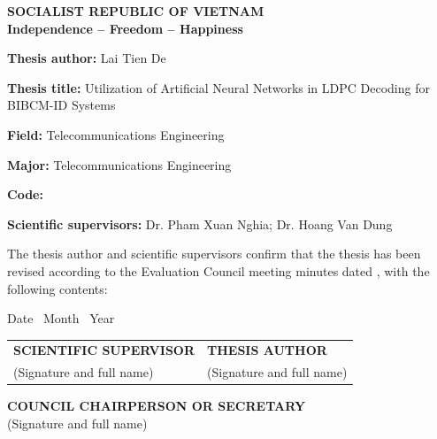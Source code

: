 \begin{center}
\textbf{SOCIALIST REPUBLIC OF VIETNAM}\\
\textbf{Independence -- Freedom -- Happiness}
\end{center}

\vspace{0.4cm}
\noindent\textbf{Thesis author:} Lai Tien De

\noindent\textbf{Thesis title:} Utilization of Artificial Neural Networks in LDPC Decoding for BIBCM-ID Systems

\noindent\textbf{Field:} Telecommunications Engineering

\noindent\textbf{Major:} Telecommunications Engineering

\noindent\textbf{Code:} \dotfill

\noindent\textbf{Scientific supervisors:} Dr. Pham Xuan Nghia; Dr. Hoang Van Dung

\vspace{0.25cm}
\noindent The thesis author and scientific supervisors confirm that the thesis has been revised according to the Evaluation Council meeting minutes dated \dotfill, with the following contents:

\vspace{0.25cm}
\noindent\dotfill

\vspace{0.25cm}
\noindent\dotfill

\vspace{0.25cm}
\noindent\dotfill

\vspace{0.45cm}
\noindent Date \dotfill\ Month \dotfill\ Year \dotfill

\vspace{0.55cm}
\noindent\begin{tabularx}{\textwidth}{>{\centering\arraybackslash}X>{\centering\arraybackslash}X}
\textbf{SCIENTIFIC SUPERVISOR} & \textbf{THESIS AUTHOR}\\[1.6cm]
(Signature and full name) & (Signature and full name)
\end{tabularx}

\vspace{0.65cm}
\begin{center}
\textbf{COUNCIL CHAIRPERSON OR SECRETARY}\\[1.1cm]
(Signature and full name)
\end{center}
